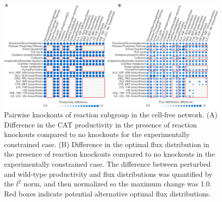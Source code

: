 \documentclass[journal=asbcd6,manuscript=article]{achemso}
\begin{document}
\clearpage

\begin{figure}[t!]
\includegraphics[width=1.0\textwidth]{./figs/Fig-7-FluxDistribution-Analysis.pdf}
\caption{Pairwise knockouts of reaction subgroup in the cell-free network.
(A) Difference in the CAT productivity in the presence of reaction knockouts compared to no knockouts for the experimentally constrained case.
(B) Difference in the optimal flux distribution in the presence of reaction knockouts compared to no knockouts in the experimentally constrained case.
The difference between perturbed and wild-type productivity and flux distributions was quantified by the $l^{2}$ norm, and then normalized so the maximum change was 1.0.
Red boxes indicate potential alternative optimal flux distributions.}
\label{fig:norm}
\end{figure}

\clearpage


\end{document}
